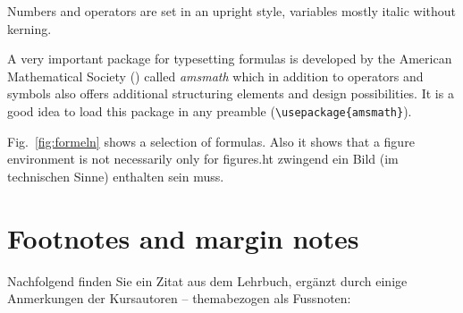 \documentclass[11pt, a4paper]{article}
\let\oldmarginpar\marginpar
\renewcommand{\marginpar}[1]{\oldmarginpar{\textit{#1}}}
\begin{document}
Numbers and operators are set in an upright style, variables mostly italic without kerning.

A very important package for typesetting formulas is developed by the American Mathematical Society (\AmS) called \textit{amsmath} which in addition to operators and symbols also offers additional structuring elements and design possibilities. It is a good idea to load this package in any preamble (\verb+\usepackage{amsmath}+).

Fig.~\ref{fig:formeln} shows a selection of formulas. Also it shows that a figure environment is not necessarily only for figures.ht zwingend ein Bild (im technischen Sinne) enthalten sein muss.

\clearpage %

\section{Footnotes and margin notes}

Nachfolgend finden Sie ein Zitat aus dem Lehrbuch, ergänzt durch einige Anmerkungen der Kursautoren -- themabezogen als Fussnoten\marginpar{Fussnoten}:
\end{document}
